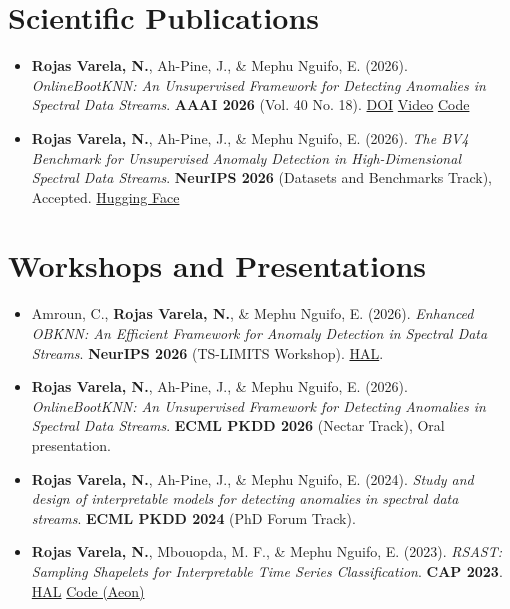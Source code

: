 \documentclass[12pt,a4paper]{article}
\begin{document}
\section*{Scientific Publications}
\begin{itemize}
\item \textbf{Rojas Varela, N.}, Ah-Pine, J., \& Mephu Nguifo, E. (2026). \textit{OnlineBootKNN: An Unsupervised Framework for Detecting Anomalies in Spectral Data Streams}. \textbf{AAAI 2026} (Vol. 40 No. 18). \href{https://doi.org/10.1609/aaai.v40i18.38611}{DOI} \textbar{} \href{https://underline.io/lecture/141774-onlinebootknn-an-unsupervised-framework-for-detecting-anomalies-in-spectral-data-streams}{Video} \textbar{} \href{https://github.com/nirojasva/spectral-benchmark}{Code}
\item \textbf{Rojas Varela, N.}, Ah-Pine, J., \& Mephu Nguifo, E. (2026). \textit{The BV4 Benchmark for Unsupervised Anomaly Detection in High-Dimensional Spectral Data Streams}. \textbf{NeurIPS 2026} (Datasets and Benchmarks Track), Accepted. \href{https://huggingface.co/datasets/nirojasva/spectral-benchmark-bv4}{Hugging Face}
\end{itemize}

\section*{Workshops and Presentations}
\begin{itemize}
\item Amroun, C., \textbf{Rojas Varela, N.}, \& Mephu Nguifo, E. (2026). \textit{Enhanced OBKNN: An Efficient Framework for Anomaly Detection in Spectral Data Streams}. \textbf{NeurIPS 2026} (TS-LIMITS Workshop). \href{https://hal.science/hal-05803665/}{HAL}.
\item \textbf{Rojas Varela, N.}, Ah-Pine, J., \& Mephu Nguifo, E. (2026). \textit{OnlineBootKNN: An Unsupervised Framework for Detecting Anomalies in Spectral Data Streams}. \textbf{ECML PKDD 2026} (Nectar Track), Oral presentation.
\item \textbf{Rojas Varela, N.}, Ah-Pine, J., \& Mephu Nguifo, E. (2024). \textit{Study and design of interpretable models for detecting anomalies in spectral data streams}. \textbf{ECML PKDD 2024} (PhD Forum Track).
\item \textbf{Rojas Varela, N.}, Mbouopda, M. F., \& Mephu Nguifo, E. (2023). \textit{RSAST: Sampling Shapelets for Interpretable Time Series Classification}. \textbf{CAP 2023}. \href{https://hal.science/hal-04311309/}{HAL} \textbar{} \href{https://www.aeon-toolkit.org/en/v1.1.0/api_reference/auto_generated/aeon.transformations.collection.shapelet_based.RSAST.html}{Code (Aeon)}
\end{itemize}
\end{document}
